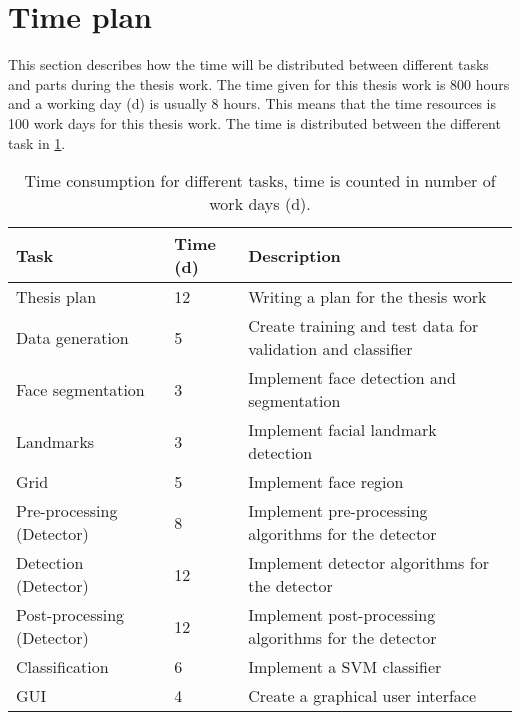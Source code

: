 \section{Time plan}

This section describes how the time will be distributed between different tasks and parts during the thesis work. The time given for this thesis work is 800 hours and a working day (d) is usually 8 hours. This means that the  time resources is 100 work days for this thesis work. The time is distributed between the different task in \cref{table:time_consumption}.

\begin{table}[H]
\centering
\caption{Time consumption for different tasks, time is counted in number of work days (d).}
\label{table:time_consumption}
\begin{tabular}{|p{}|p{}|p{}|}
	\hline
	\textbf{Task}              & \textbf{Time (d)} & \textbf{Description}                                        \\ \hline
	Thesis plan                & 12                & Writing a plan for the thesis work                          \\ \hline
	Data generation            & 5                 & Create training and test data for validation and classifier \\ \hline
	Face segmentation          & 3                 & Implement face detection and segmentation                   \\ \hline
	Landmarks                  & 3                 & Implement facial landmark detection                         \\ \hline
	Grid                       & 5                 & Implement face region                                       \\ \hline
	Pre-processing (Detector)  & 8                 & Implement pre-processing algorithms for the detector        \\ \hline
	Detection (Detector)       & 12                & Implement detector algorithms for the detector              \\ \hline
	Post-processing (Detector) & 12                & Implement post-processing algorithms for the detector       \\ \hline
	Classification             & 6                 & Implement a SVM classifier                                  \\ \hline
	GUI                        & 4                 & Create a graphical user interface                           \\ \hline

\end{tabular}
\end{table}
